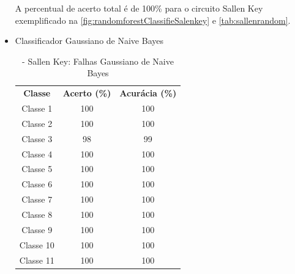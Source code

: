 \begin{itemize}
A percentual de acerto total é de 100\% para o circuito Sallen Key exemplificado na \ref{fig:randomforestClassifieSalenkey} e \ref{tab:sallenrandom}. 

\newpage
 \item Classificador Gaussiano de Naive Bayes
 
 \begin{table}[ht]
\centering
\begin{tabular}{ccc}
\textbf{Classe} & \textbf{Acerto (\%)} & \textbf{Acurácia (\%)} \\
Classe 1        & 100                  & 100                    \\
Classe 2        & 100                  & 100                    \\
Classe 3        & 98                  & 99                    \\
Classe 4        & 100                  & 100                    \\
Classe 5        & 100                  & 100                    \\
Classe 6        & 100                  & 100                    \\
Classe 7        & 100                  & 100                    \\
Classe 8        & 100                  & 100                    \\
Classe 9        & 100                  & 100                    \\
Classe 10       & 100                  & 100                    \\
Classe 11       & 100                  & 100                                 
\end{tabular}
\caption{\label{tab:sallenGND}- Sallen Key: Falhas Gaussiano de Naive Bayes}
\end{table}



\end{itemize}

